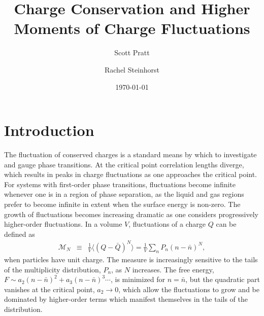 \documentclass[aps,prc,nofootinbib,showpacs,superscriptaddress,groupedaddress]{revtex4-1}
\begin{document}
\title{Charge Conservation and Higher Moments of Charge Fluctuations}
\author{Scott Pratt}
\author{Rachel Steinhorst}
\date{\today}

\pacs{}

\begin{abstract}

\end{abstract}

\maketitle

\section{Introduction}\label{sec:intro}

The fluctuation of conserved charges is a standard means by which to investigate and gauge phase transitions. At the critical point correlation lengths diverge, which results in peaks in charge fluctuations as one approaches the critical point. For systems with first-order phase transitions, fluctuations become infinite whenever one is in a region of phase separation, as the liquid and gas regions prefer to become infinite in extent when the surface energy is non-zero. The growth of fluctuations becomes increasing dramatic as one considers progressively higher-order fluctuations. In a volume $V$, fluctuations of a charge $Q$ can be defined as
\begin{eqnarray}\label{eq:kappadef}
\mathcal{M}_N&\equiv&\frac{1}{V}\langle(Q-\bar{Q})^N\rangle=\frac{1}{V}\sum_n P_n(n-\bar{n})^N,
\end{eqnarray}
when particles have unit charge. The measure is increasingly sensitive to the tails of the multiplicity distribution, $P_n$, as $N$ increases. The free energy, $F\sim a_2(n-\bar{n})^2 + a_3(n-\bar{n})^3\cdots$, is minimized for $n=\bar{n}$, but the quadratic part vanishes at the critical point, $a_2\rightarrow 0$, which allow the fluctuations to grow and be dominated by higher-order terms which manifest themselves in the tails of the distribution. 
\end{document}
